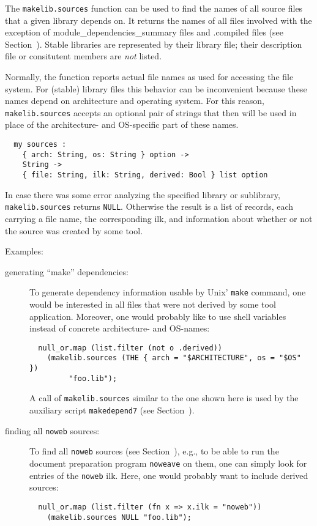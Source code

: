 The {\tt makelib.sources} function can be used to find the names of all
source files that a given library depends on.  It returns the names of
all files involved with the exception of module_dependencies_summary files and .compiled files
(see Section~).  Stable libraries are represented by
their library file; their description file or consitutent members are
{\em not} listed.

Normally, the function reports actual file names as used for accessing
the file system.  For (stable) library files this behavior can be
inconvenient because these names depend on architecture and operating
system.  For this reason, {\tt makelib.sources} accepts an optional pair of
strings that then will be used in place of the architecture- and
OS-specific part of these names.

\begin{verbatim}
  my sources :
    { arch: String, os: String } option ->
    String ->
    { file: String, ilk: String, derived: Bool } list option
\end{verbatim}

In case there was some error analyzing the specified library or sublibrary,
{\tt makelib.sources} returns {\tt NULL}.  Otherwise the result is a list
of records, each carrying a file name, the corresponding ilk, and
information about whether or not the source was created by some tool.

Examples:

\begin{description}
\item[generating ``make'' dependencies:]
To generate dependency information usable by Unix' {\tt make} command,
one would be interested in all files that were not derived by some
tool application.  Moreover, one would probably like to use shell
variables instead of concrete architecture- and OS-names:
\begin{verbatim}
  null_or.map (list.filter (not o .derived))
    (makelib.sources (THE { arch = "$ARCHITECTURE", os = "$OS" })
         "foo.lib");
\end{verbatim}
A call of {\tt makelib.sources} similar to the one shown here is used by
the auxiliary script {\tt makedepend7} (see
Section~).
\item[finding all {\tt noweb} sources:]
To find all {\tt noweb} sources (see Section~),
e.g., to be able to run the document preparation program {\tt noweave}
on them, one can simply look for entries of the {\tt noweb} ilk.
Here, one would probably want to include derived sources:
\begin{verbatim}
  null_or.map (list.filter (fn x => x.ilk = "noweb"))
    (makelib.sources NULL "foo.lib");
\end{verbatim}
\end{description}

